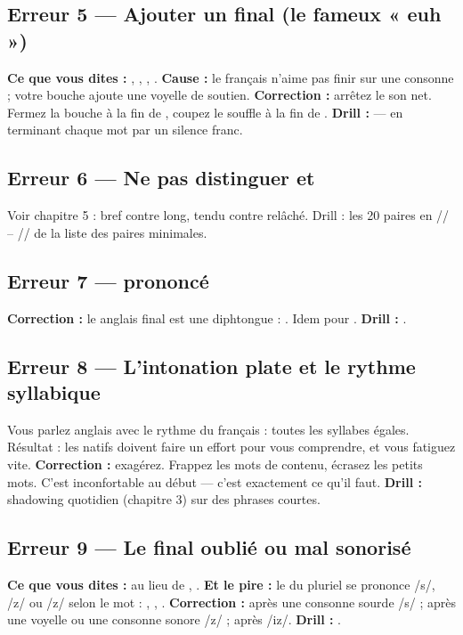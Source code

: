 \subsection{Erreur 5 --- Ajouter un  final (le fameux « euh »)}
\textbf{Ce que vous dites :}  ,  , 
,  .
\textbf{Cause :} le français n'aime pas finir sur une consonne ; votre bouche ajoute une
voyelle de soutien.
\textbf{Correction :} arrêtez le son net. Fermez la bouche à la fin de ,
coupez le souffle à la fin de .
\textbf{Drill :}  --- en terminant
chaque mot par un silence franc.

\subsection{Erreur 6 --- Ne pas distinguer  et }
Voir chapitre 5 : bref contre long, tendu contre relâché. Drill : les 20 paires en
/\ipaiot/ -- /\ipaee\ipalong/ de la liste des paires minimales.

\subsection{Erreur 7 ---  prononcé }
\textbf{Correction :} le  anglais final est une diphtongue : .
Idem pour .
\textbf{Drill :} .

\subsection{Erreur 8 --- L'intonation plate et le rythme syllabique}
Vous parlez anglais avec le rythme du français : toutes les syllabes égales. Résultat : les
natifs doivent faire un effort pour vous comprendre, et vous fatiguez vite.
\textbf{Correction :} exagérez. Frappez les mots de contenu, écrasez les petits mots.
C'est inconfortable au début --- c'est exactement ce qu'il faut.
\textbf{Drill :} shadowing quotidien (chapitre 3) sur des phrases courtes.

\subsection{Erreur 9 --- Le  final oublié ou mal sonorisé}
\textbf{Ce que vous dites :}  au lieu de , .
\textbf{Et le pire :} le  du pluriel se prononce /s/, /z/ ou /\ipaiot z/ selon le mot :
 ,  ,  .
\textbf{Correction :} après une consonne sourde \ra /s/ ; après une voyelle ou une consonne
sonore \ra /z/ ; après  \ra /iz/.
\textbf{Drill :} .

